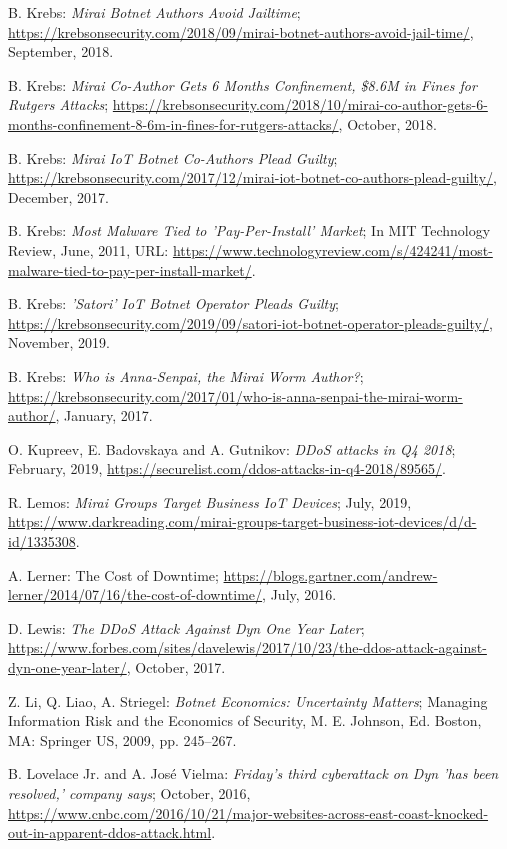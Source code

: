 \begin{thebibliography}{99}
 B. Krebs: \emph{Mirai Botnet Authors Avoid Jailtime}; \url{https://krebsonsecurity.com/2018/09/mirai-botnet-authors-avoid-jail-time/}, September, 2018.

 B. Krebs: \emph{Mirai Co-Author Gets 6 Months Confinement, \$8.6M in Fines for Rutgers Attacks}; \url{https://krebsonsecurity.com/2018/10/mirai-co-author-gets-6-months-confinement-8-6m-in-fines-for-rutgers-attacks/}, October, 2018.

 B. Krebs: \emph{Mirai IoT Botnet Co-Authors Plead Guilty}; \url{https://krebsonsecurity.com/2017/12/mirai-iot-botnet-co-authors-plead-guilty/}, December, 2017.

 B. Krebs: \emph{Most Malware Tied to 'Pay-Per-Install' Market}; In MIT Technology Review, June, 2011, URL: \url{https://www.technologyreview.com/s/424241/most-malware-tied-to-pay-per-install-market/}.

 B. Krebs: \emph{'Satori' IoT Botnet Operator Pleads Guilty}; \url{https://krebsonsecurity.com/2019/09/satori-iot-botnet-operator-pleads-guilty/}, November, 2019.

 B. Krebs: \emph{Who is Anna-Senpai, the Mirai Worm Author?}; \url{https://krebsonsecurity.com/2017/01/who-is-anna-senpai-the-mirai-worm-author/}, January, 2017.

 O. Kupreev, E. Badovskaya and A. Gutnikov: \emph{DDoS attacks in Q4 2018}; February, 2019, \url{https://securelist.com/ddos-attacks-in-q4-2018/89565/}.

 R. Lemos: \emph{Mirai Groups Target Business IoT Devices}; July, 2019, \url{https://www.darkreading.com/mirai-groups-target-business-iot-devices/d/d-id/1335308}.

 A. Lerner: The Cost of Downtime; \url{https://blogs.gartner.com/andrew-lerner/2014/07/16/the-cost-of-downtime/}, July, 2016.

 D. Lewis: \emph{The DDoS Attack Against Dyn One Year Later}; \url{https://www.forbes.com/sites/davelewis/2017/10/23/the-ddos-attack-against-dyn-one-year-later/}, October, 2017.

 Z. Li, Q. Liao, A. Striegel:  \emph{Botnet Economics: Uncertainty Matters}; Managing Information Risk and the Economics of Security, M. E. Johnson, Ed. Boston, MA: Springer US, 2009, pp. 245--267.

 B. Lovelace Jr. and A. José Vielma: \emph{Friday's third cyberattack on Dyn 'has been resolved,' company says}; October, 2016, \url{https://www.cnbc.com/2016/10/21/major-websites-across-east-coast-knocked-out-in-apparent-ddos-attack.html}.


\end{thebibliography}
